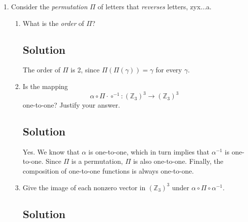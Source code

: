 \documentclass[12pt]{amsart}
\begin{document}
\begin{enumerate}
\begin{enumerate}
\begin{enumerate}
\end{enumerate}
\item Consider the {\it permutation} $\Pi$ of letters that {\it reverses} letters, zyx$\ldots$a.
\begin{enumerate}\setlength{\itemsep}{6pt}

\item What is the {\it order} of $\Pi$?
\subsection*{Solution}
The order of $\Pi$ is 2, since $\Pi(\Pi(\gamma)) = \gamma$ for every $\gamma$.

\item Is the mapping
\[ \alpha \circ \Pi \cdot \circ^{-1} : (\mathbb Z_3 )^3 \to (\mathbb Z_3 )^3 \]
one-to-one? Justify your answer.
\subsection*{Solution}
Yes. We know that $\alpha$ is one-to-one, which in turn implies that $\alpha^{-1}$ is one-to-one. Since $\Pi$ is a permutation, $\Pi$ is also one-to-one. Finally, the composition of one-to-one functions is always one-to-one.

\item Give the image of each nonzero vector in $(\mathbb Z_3 )^3$ under $\alpha \circ \Pi \circ \alpha^{-1}$.
\subsection*{Solution}


\end{enumerate}
\end{enumerate}
\end{enumerate}
\end{document}
